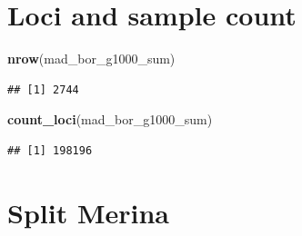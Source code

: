 \documentclass[
]{article}
\newenvironment{Shaded}{\begin{snugshade}}{\end{snugshade}}
\newcommand{\FunctionTok}[1]{\textcolor[rgb]{0.13,0.29,0.53}{\textbf{#1}}}
\newcommand{\NormalTok}[1]{#1}
\begin{document}
\section{Loci and sample count}\label{loci-and-sample-count-1}

\begin{Shaded}
\begin{Highlighting}[]
\FunctionTok{nrow}\NormalTok{(mad\_bor\_g1000\_sum)}
\end{Highlighting}
\end{Shaded}

\begin{verbatim}
## [1] 2744
\end{verbatim}

\begin{Shaded}
\begin{Highlighting}[]
\FunctionTok{count\_loci}\NormalTok{(mad\_bor\_g1000\_sum)}
\end{Highlighting}
\end{Shaded}

\begin{verbatim}
## [1] 198196
\end{verbatim}

\section{Split Merina}\label{split-merina}
\end{document}
